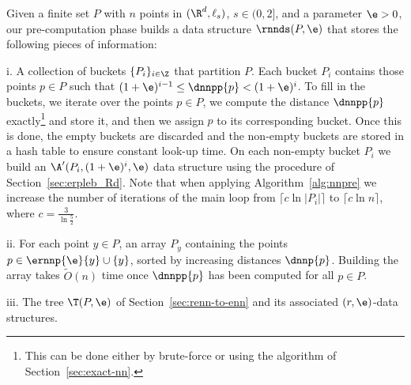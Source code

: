 Given a finite set $P$ with $n$ points in $(\R^d,\ell_s)$, $s\in
(0,2]$, and a parameter $\e> 0$, our pre-computation phase builds a
data structure $\rnnds(P,\e)$ that stores the following pieces of
information:
\begin{slist}
\item[i.] A collection of buckets $\{P_i\}_{i\in\Z}$ that
  partition $P$. Each bucket $P_i$ contains those points $p\in P$ such
  that $(1+\e)^{i-1}\leq \dnnpp{p} < (1+\e)^i$. To fill in the
  buckets, we iterate over the points $p\in P$, we compute the
  distance $\dnnpp{p}$ exactly\footnote{This can be done either by
    brute-force or using the algorithm of
    Section~\ref{sec:exact-nn}.} and store it, and then we assign $p$
  to its corresponding bucket.
Once this is done, the empty buckets are discarded and the non-empty
 buckets are stored in a hash table to ensure constant look-up
 time. On each non-empty bucket $P_i$ we build an $\A'(P_i, (1+\e)^i,
 \e)$ data structure using the procedure of
 Section~\ref{sec:erpleb_Rd}.
Note that when applying Algorithm~\ref{alg:nnpre} we increase the
 number of iterations of the main loop from $\lceil c \ln |P_i|\rceil$
 to $\lceil c\ln n\rceil$, where $c=\frac{3}{\ln\frac{5}{2}}$.
\item[ii.] For each point $y\in P$, an array $P_y$ containing the
  points $p\in \ernnp{\e}{y}\cup\{y\}$, sorted by increasing
  distances $\dnnp{p}$. Building the array takes $\tilde O(n)$ time once
  $\dnnpp{p}$ has been computed for all $p\in P$.
\item[iii.] The tree $\T(P,\e)$ of
  Section~\ref{sec:renn-to-enn} and its associated $(r,\e)$-\pleb data
  structures.
\end{slist}

\smallskip

